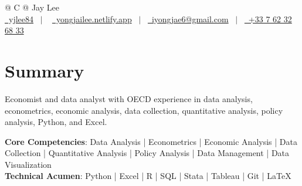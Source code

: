 \documentclass[a4paper,12pt]{article}
\begin{document}
\pagestyle{empty} 



\begin{tabularx}{\linewidth}{@{} C @{}}
\Huge{Jay Lee} \\[7.5pt]
\href{https://github.com/yjlee84}{\raisebox{-0.05\height}\faGithub\ yjlee84} \ $|$ \ 
\href{https://yongjailee.netlify.app}{\raisebox{-0.05\height}\faGlobe \ yongjailee.netlify.app} \ $|$ \ 
\href{mailto:email@mysite.com}{\raisebox{-0.05\height}\faEnvelope \ iyongjae6@gmail.com} \ $|$ \ 
\href{tel:+000000000000}{\raisebox{-0.05\height}\faMobile \ +33 7 62 32 68 33} \\
\end{tabularx}


\section{Summary}
Economist and data analyst with OECD experience in data analysis, econometrics, economic analysis, data collection, quantitative analysis, policy analysis, Python, and Excel.

\textbf{Core Competencies}: Data Analysis | Econometrics | Economic Analysis | Data Collection | Quantitative Analysis | Policy Analysis | Data Management | Data Visualization\\
\textbf{Technical Acumen}: Python | Excel | R | SQL | Stata | Tableau | Git | \LaTeX{}
\end{document}
